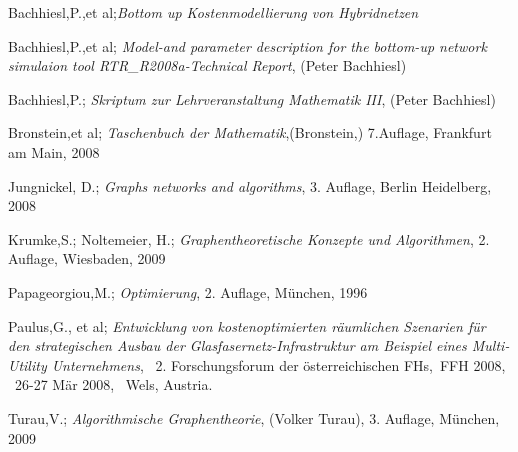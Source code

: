 \documentclass[oneside,bachelor,etd]{BYUPhys}
\begin{document}
\cleardoublepage
  {}
 \begin{thebibliography}{00}
 
 Bachhiesl,P.,et al;{\em  Bottom up Kostenmodellierung von Hybridnetzen }
 
 Bachhiesl,P.,et al; {\em Model-and parameter description for the bottom-up network simulaion tool RTR\_R2008a-Technical Report}, (Peter Bachhiesl)

 Bachhiesl,P.; {\em Skriptum zur Lehrveranstaltung Mathematik III}, (Peter Bachhiesl)
 
Bronstein,et al; {\em Taschenbuch der Mathematik},(Bronstein,) 7.Auflage, Frankfurt am Main, 2008


Jungnickel, D.; {\em Graphs networks and algorithms}, 3. Auflage, Berlin Heidelberg, 2008


 Krumke,S.; Noltemeier, H.; {\em Graphentheoretische Konzepte und Algorithmen}, 2. Auflage, Wiesbaden, 2009
  
Papageorgiou,M.; {\em Optimierung}, 2. Auflage, München, 1996

Paulus,G., et al; {\em Entwicklung von kostenoptimierten räumlichen Szenarien für den strategischen Ausbau der Glasfasernetz-Infrastruktur am Beispiel eines Multi-Utility Unternehmens}, \ 2. Forschungsforum der österreichischen FHs,\ FFH 2008, \ 26-27 Mär 2008, \ Wels, Austria.
 
 Turau,V.; {\em Algorithmische Graphentheorie}, (Volker Turau), 3. Auflage, München, 2009


\end{thebibliography}


\end{document}

